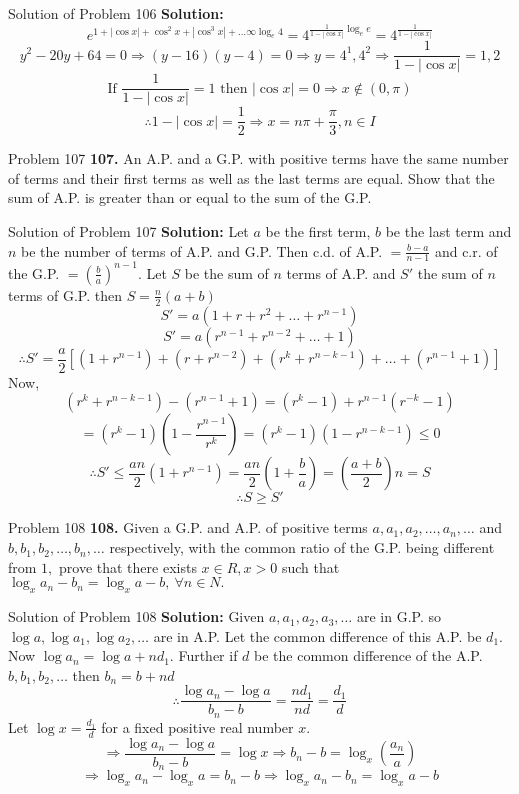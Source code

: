 \documentclass[aspectratio=1610,8pt]{beamer}
\begin{document}
\begin{frame}{Solution of Problem 106}
  \textbf{Solution:} $$e^{{1 + |\cos x| + \cos^2x + |\cos^3x| + \ldots \infty}\log_e 4} = 4^{{\frac{1}{1 - |\cos x|}}\log_e e} =
  4^{\frac{1}{1 - |\cos x|}}$$
  $$y^2 - 20y + 64 = 0 \Rightarrow (y - 16)(y - 4) = 0 \Rightarrow y = 4^1, 4^2\Rightarrow \frac{1}{1 - |\cos x|} = 1, 2$$
  $$\text{If~}\frac{1}{1 - |\cos x|} = 1 \text{~then~} |\cos x| = 0 \Rightarrow x\notin(0, \pi)$$
  $$\therefore 1 - |\cos x| = \frac{1}{2} \Rightarrow x = n\pi + \frac{\pi}{3}, n \in I$$
\end{frame}
\begin{frame}{Problem 107}
  \textbf{107.} An A.P. and a G.P. with positive terms have the same number of terms and their first terms as well as the last
  terms are equal. Show that the sum of A.P. is greater than or equal to the sum of the G.P.
\end{frame}
\begin{frame}{Solution of Problem 107}
  \textbf{Solution:} Let $a$ be the first term, $b$ be the last term and $n$ be the number of terms of A.P. and G.P.
  \linebreak\linebreak
  Then c.d. of A.P. $= \frac{b - a}{n - 1}$ and c.r. of the G.P. $= \left(\frac{b}{a}\right)^{n - 1}.$ Let $S$ be the sum of $n$
  terms of A.P. and $S'$ the sum of $n$ terms of G.P. then $S = \frac{n}{2}(a + b)$
  \linebreak\linebreak
  $$S' = a(1 + r + r^2 + \ldots + r^{n - 1})$$
  $$S' = a(r^{n - 1} + r^{n - 2} + \ldots + 1)$$
  $$\therefore S' = \frac{a}{2}[(1 + r^{n - 1}) + (r + r^{n - 2}) + (r^k + r^{n - k - 1}) + \ldots + (r^{n - 1} + 1)]$$
  Now, $$(r^k + r^{n - k - 1}) - (r^{n - 1} + 1) = (r^k - 1) + r^{n - 1}(r^{-k} - 1)$$
  $$= (r^k - 1)\left(1 - \frac{r^{n - 1}}{r^k}\right) = (r^k - 1)(1 - r^{n - k - 1})\leq 0$$
  $$\therefore S'\leq \frac{an}{2}(1 + r^{n - 1}) = \frac{an}{2}\left(1 + \frac{b}{a}\right) = \left(\frac{a + b}{2}\right)n = S$$
  $$\therefore S \geq S'$$
\end{frame}
\begin{frame}{Problem 108}
  \textbf{108.} Given a G.P. and A.P. of positive terms $a, a_1, a_2, \ldots, a_n, \ldots$ and $b, b_1, b_2, \ldots, b_n, \ldots$
  respectively, with the common ratio of the G.P. being different from $1,$ prove that there exists $x\in R, x > 0$ such that
  $\log_x a_n - b_n = \log_x a - b,~\forall n\in N.$
\end{frame}
\begin{frame}{Solution of Problem 108}
  \textbf{Solution:} Given $a, a_1, a_2, a_3, \ldots$ are in G.P. so $\log a, \log a_1, \log a_2, \ldots$ are in A.P. Let the
  common difference of this A.P. be $d_1.$ Now $\log a_n = \log a + nd_1.$ Further if $d$ be the common difference of the A.P. $b,
  b_1, b_2, \ldots$ then $b_n = b + nd$
  $$\therefore \frac{\log a_n - \log a}{b_n - b} = \frac{nd_1}{nd} = \frac{d_1}{d}$$
  Let $\log x = \frac{d_1}{d}$ for a fixed positive real number $x.$
  $$\Rightarrow \frac{\log a_n - \log a}{b_n - b} = \log x \Rightarrow b_n - b = \log_x\left(\frac{a_n}{a}\right)$$
  $$\Rightarrow \log_x a_n - \log_x a = b_n - b \Rightarrow \log_x a_n - b_n = \log_x a - b$$
\end{frame}
\end{document}
